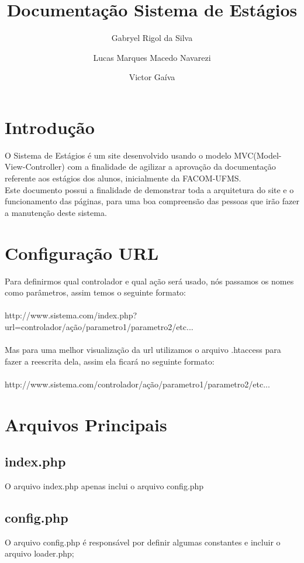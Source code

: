 \documentclass{article}
\title{Documenta\c{c}\~ao Sistema de Est\'agios}
\author{Gabryel Rigol da Silva \and Lucas Marques Macedo Navarezi \and Victor Ga\'iva}
\begin{document}
\maketitle

\newpage
\tableofcontents
\newpage
\section{Introdu\c{c}\~ao}
O Sistema de Estágios é um site desenvolvido usando o modelo MVC(Model-View-Controller) com a finalidade de agilizar a aprovação da documentação referente aos estágios dos alunos, inicialmente da FACOM-UFMS.\\
Este documento possui a finalidade de demonstrar toda a arquitetura do site e o funcionamento das páginas, para uma boa compreensão das pessoas que irão fazer a manutenção deste sistema.

\section{Configura\c{c}\~ao URL}
Para definirmos qual controlador e qual ação será usado, nós passamos os nomes como parâmetros, assim temos o seguinte formato:\\\\
http://www.sistema.com/index.php?url=controlador/ação/parametro1/parametro2/etc...\\\\
Mas para uma melhor visualiza\c{c}\~ao da url utilizamos o arquivo .htaccess para fazer a reescrita dela, assim ela ficará no seguinte formato:\\\\
http://www.sistema.com/controlador/a\c{c}\~ao/parametro1/parametro2/etc...

\newpage
\section{Arquivos Principais}
\subsection{index.php} \label{sec:index}
O arquivo index.php apenas inclui o arquivo config.php

\subsection{config.php} \label{sec:config}
O arquivo config.php é responsável por definir algumas constantes e incluir o arquivo loader.php;
\end{document}
